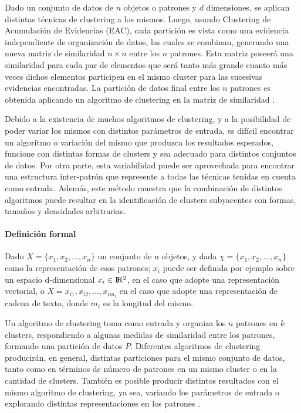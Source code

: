 \bigskip Dado un conjunto de datos de \(n\) objetos o patrones y \(d\) dimensiones, se aplican distintas técnicas de clustering a los mismos. Luego, usando Clustering de Acumulación de Evidencias (EAC), cada partición es vista como una evidencia independiente de organización de datos, las cuales se combinan, generando una nueva matriz de similaridad \(n \times n\) entre los \(n\) patrones. Esta matriz poseerá una similaridad para cada par de elementos que será tanto más grande cuanto más veces dichos elementos participen en el mismo cluster para las sucesivas evidencias encontradas. La partición de datos final entre los \(n\) patrones es obtenida aplicando un algoritmo de clustering en la matriz de similaridad \citep{fred2005combining}.

\bigskip Debido a la existencia de muchos algoritmos de clustering, y a la posibilidad de poder variar los mismos con distintos parámetros de entrada, es difícil encontrar un algoritmo o variación del mismo que produzca los resultados esperados, funcione con distintas formas de clusters y sea adecuado para distintos conjuntos de datos. Por otra parte, esta variabilidad puede ser aprovechada para encontrar una estructura inter-patrón que represente a todas las técnicas tenidas en cuenta como entrada. Además, este método muestra que la combinación de distintos algoritmos puede resultar en la identificación de clusters subyacentes con formas, tamaños y densidades arbitrarias.

\paragraph{Definición formal}
Dado \(X = \{x_1, x_2,... , x_n\}\) un conjunto de n objetos, y dada \(\chi = \{x_1, x_2,... , x_n\}\) como la representación de esos patrones; \(x_i\) puede ser definida por ejemplo sobre un espacio d-dimensional \(x_i \in \rm I\!R^2\), en el caso que adopte una representación vectorial, o \(X = x_{i1}, x_{i2},... , x_{im_i}\) en el caso que adopte una representación de cadena de texto, donde \(m_i\) es la longitud del mismo.

\bigskip Un algoritmo de clustering toma  como entrada y organiza los \(n\) patrones en \(k\) clusters, respondiendo a algunas medidas de similaridad entre los patrones, formando una partición de datos \(P\). Diferentes algoritmos de clustering producirán, en general, distintas particiones para el mismo conjunto de datos, tanto como en términos de número de patrones en un mismo cluster o en la cantidad de clusters. También es posible producir distintos resultados con el mismo algoritmo de clustering, ya sea, variando los parámetros de entrada o explorando distintas representaciones en los patrones \citep{fred2005combining}.

